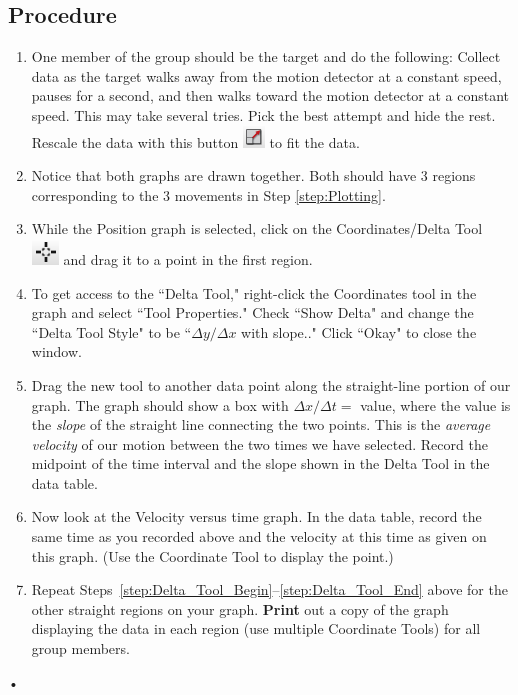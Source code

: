 \documentclass[main.tex]{subfiles}
\begin{document}
\subsection*{Procedure}
\begin{enumerate}
\item\label{step:Plotting}
One member of the group should be the target and do the following: Collect data as the target walks away from the motion detector at a constant speed, pauses for a second, and then walks toward the motion detector at a constant speed. This may take several tries. Pick the best attempt and hide the rest. Rescale the data with this button \includegraphics{Rescale} to fit the data.
\item
Notice that both graphs are drawn together. Both should have 3 regions corresponding to the 3 movements in Step \ref{step:Plotting}.
\item\label{step:Delta_Tool_Begin}
While the Position graph is selected, click on the Coordinates/Delta Tool \includegraphics{Coordinates_Tool} and drag it to a point in the first region.
\item
To get access to the ``Delta Tool," right-click the Coordinates tool in the graph and select ``Tool Properties." Check ``Show Delta" and change the ``Delta Tool Style" to be ``$\Delta y/\Delta x$ with slope.." Click ``Okay" to close the window.
\item
Drag the new tool to another data point along the straight-line portion of our graph. The graph should show a box with $\Delta x/\Delta t =$ value, where the value is the \emph{slope} of the straight line connecting the two points. This is the \emph{average velocity} of our motion between the two times we have selected. Record the midpoint of the time interval and the slope shown in the Delta Tool in the data table.
\item \label{step:Delta_Tool_End}
Now look at the Velocity versus time graph. In the data table, record the same time as you recorded above and the velocity at this time as given on this graph. (Use the Coordinate Tool to display the point.) 
\item
Repeat Steps~\ref{step:Delta_Tool_Begin}--\ref{step:Delta_Tool_End} above for the other straight regions on your graph. \textbf{Print} out a copy of the graph displaying the data in each region (use multiple Coordinate Tools) for all group members. 
\end{enumerate}•
\end{document}
